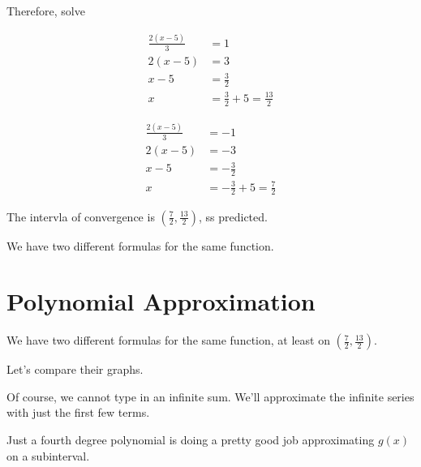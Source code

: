 \documentclass{ximera}
\begin{document}
\begin{example}
Therefore, solve



\begin{align*}
\frac{2(x-5)}{3} & = 1   \\
2(x-5) & = 3    \\
x-5 & = \frac{3}{2}    \\
x & = \frac{3}{2}  + 5 = \frac{13}{2}
\end{align*}




\begin{align*}
\frac{2(x-5)}{3} & = -1   \\
2(x-5) & = -3    \\
x-5 & = -\frac{3}{2}    \\
x & = -\frac{3}{2}  + 5 = \frac{7}{2}
\end{align*}




The intervla of convergence is $\left( \frac{7}{2}, \frac{13}{2}\right)$, ss predicted.




\end{example}


We have two different formulas for the same function.









\section{Polynomial Approximation}


We have two different formulas for the same function, at least on $\left( \frac{7}{2}, \frac{13}{2}\right)$.


Let's compare their graphs.

Of course, we cannot type in an infinite sum.  We'll approximate the infinite series with just the first few terms.




\begin{center}
\end{center}


Just a fourth degree polynomial is doing a pretty good job approximating $g(x)$ on a subinterval.
\end{document}
